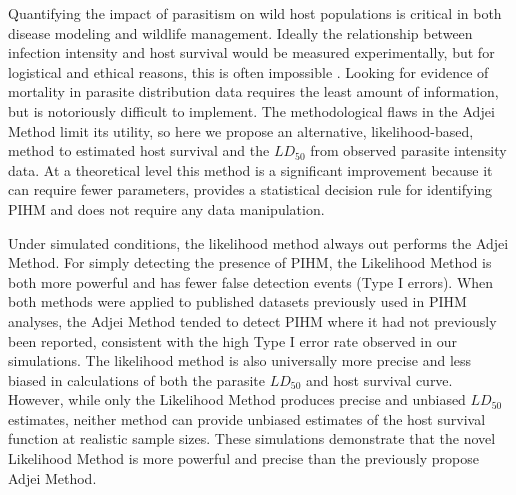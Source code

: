 \documentclass[12pt, a4paper]{article}
\begin{document}
Quantifying the impact of parasitism on wild host populations is critical in
both disease modeling and wildlife management. Ideally the relationship between
infection intensity and host survival would be measured experimentally, but for
logistical and ethical reasons, this is often impossible \citep{McCallum2000a}.
Looking for evidence of mortality in parasite distribution data requires the
least amount of information, but is notoriously difficult to implement. The
methodological flaws in the Adjei Method limit its utility, so here we propose
an alternative, likelihood-based, method to estimated host survival and the
$LD_{50}$ from observed parasite intensity data.  At a theoretical level this
method is a significant improvement because it can require fewer parameters,
provides a statistical decision rule for identifying PIHM and does not require
any data manipulation.

Under simulated conditions, the likelihood method always out performs the Adjei Method. For simply detecting the presence of PIHM, the Likelihood
Method is both more powerful and has fewer false detection events (Type I
errors).  When both methods were applied to published datasets previously used
in PIHM analyses, the Adjei Method tended to detect PIHM where it had not previously been
reported, consistent with the high Type I error rate observed in our
simulations. The likelihood method is also universally more precise and less
biased in calculations of both the parasite $LD_{50}$ and host survival curve.
However, while only the Likelihood Method produces precise and unbiased $LD_{50}$
estimates, neither method can provide unbiased estimates of the host survival
function at realistic sample sizes.  These simulations demonstrate that
the novel Likelihood Method is more powerful and precise than the previously propose Adjei Method.
\end{document}
